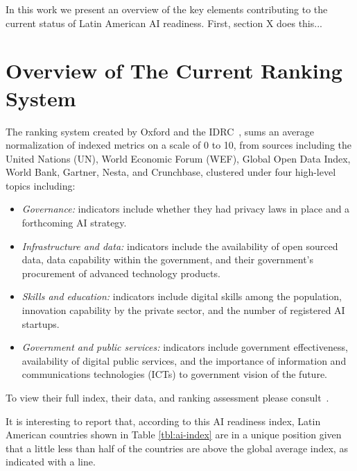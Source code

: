 \documentclass[conference]{IEEEtran}
\begin{document}
In this work we present an overview of the key elements contributing to the current status of Latin American AI readiness. First, section X does this...

\section{Overview of The Current Ranking System}

The ranking system created by Oxford and the IDRC~\cite{miller2019government}, sums an average normalization of indexed metrics on a scale of 0 to 10, from sources including the United Nations (UN), World Economic Forum (WEF), Global Open Data Index, World Bank, Gartner, Nesta, and Crunchbase, clustered under four high-level topics including:
\begin{itemize}
  \item \emph{Governance:} indicators include whether they had privacy laws in place and a forthcoming AI strategy.
  \item \emph{Infrastructure and data:} indicators include the availability of open sourced data, data capability within the government, and their government's procurement of advanced technology products.
  \item \emph{Skills and education:} indicators include digital skills among the population, innovation capability by the private sector, and the number of registered AI startups.
  \item \emph{Government and public services:} indicators include government effectiveness, availability of digital public services, and the importance of information and communications technologies (ICTs) to government vision of the future.
\end{itemize}
To view their full index, their data, and ranking assessment please consult~\cite{miller2019shared}.

It is interesting to report that, according to this AI readiness index, Latin American countries shown in Table \ref{tbl:ai-index} are in a unique position given that a little less than half of the countries are above the global average index, as indicated with a line.
\end{document}
